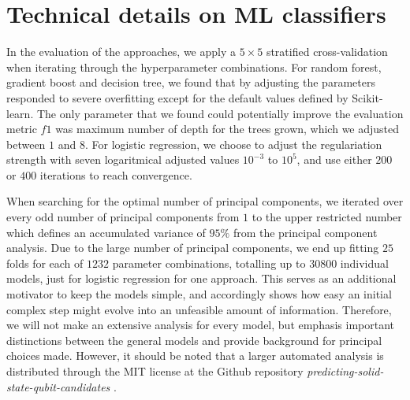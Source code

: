 \clearpage

\section{Technical details on ML classifiers}


In the evaluation of the approaches, we apply a $5\times 5$ stratified cross-validation when iterating through the hyperparameter combinations. For random forest, gradient boost and decision tree, we found that by adjusting the parameters responded to severe overfitting except for the default values defined by Scikit-learn. The only parameter that we found could potentially improve the evaluation metric $f1$ was maximum number of depth for the trees grown, which we adjusted between $1$ and $8$. For logistic regression, we choose to adjust the regulariation strength with seven logaritmical adjusted values $10^{-3}$ to $10^{5}$, and use either $200$ or $400$ iterations to reach convergence.

When searching for the optimal number of principal components, we iterated over every odd number of principal components from $1$ to the upper restricted number which defines an accumulated variance of $95\%$ from the principal component analysis. Due to the large number of principal components, we end up fitting $25$ folds for each of $1232$ parameter combinations, totalling up to $30800$ individual models, just for logistic regression for one approach. This serves as an additional motivator to keep the models simple, and accordingly shows how easy an initial complex step might evolve into an unfeasible amount of information. Therefore, we will not make an extensive analysis for every model, but emphasis important distinctions between the general models and provide background for principal choices made. However, it should be noted that a larger automated analysis is distributed through the MIT license at the Github repository \textit{predicting-solid-state-qubit-candidates} \cite{Ohebbi2021}.

